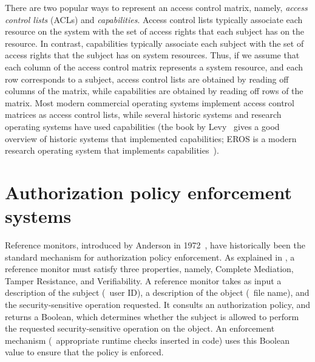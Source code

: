 There are two popular ways to represent an access control matrix, namely,
\textit{access control lists} (ACLs) and \textit{capabilities}. Access control
lists typically associate each resource on the system with the set of access
rights that each subject has on the resource. In contrast, capabilities
typically associate each subject with the set of access rights that the subject
has on system resources. Thus, if we assume that each column of the access
control matrix represents a system resource, and each row corresponds to a
subject, access control lists are obtained by reading off columns of the
matrix, while capabilities are obtained by reading off rows of the matrix.
Most modern commercial operating systems implement access control matrices as
access control lists, while several historic systems and research operating
systems have used capabilities (the book by Levy~\cite{l84} gives a good
overview of historic systems that implemented capabilities; EROS is a modern
research operating system that implements capabilities~\cite{ssf99}).

\section{Authorization policy enforcement systems}
\label{chapter:relatedwork:authpolenf}

Reference monitors, introduced by Anderson in 1972~\cite{a72}, have
historically been the standard mechanism for authorization policy enforcement.
As explained in , a reference monitor must
satisfy three properties, namely, Complete Mediation, Tamper Resistance, and
Verifiability. A reference monitor takes as input a description of the subject
(\eg~user ID), a description of the object (\eg~file name), and the
security-sensitive operation requested. It consults an authorization policy,
and returns a Boolean, which determines whether the subject is allowed to
perform the requested security-sensitive operation on the object. An
enforcement mechanism (\eg~appropriate runtime checks inserted in code) uses
this Boolean value to ensure that the policy is enforced.

